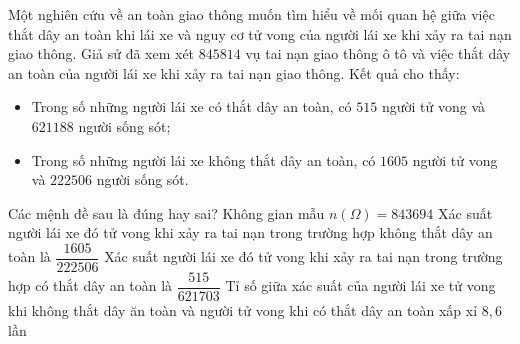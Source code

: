 \begin{ex}%

	Một nghiên cứu về an toàn giao thông muốn tìm hiểu về mối quan hệ giữa việc thắt dây an toàn khi lái xe và nguy cơ tử vong của người lái xe khi xảy ra tai nạn giao thông. Giả sử đã xem xét $845814$ vụ tai nạn giao thông ô tô và việc thắt dây an toàn của người lái xe khi xảy ra tai nạn giao thông. Kết quả cho thấy:
	\begin{itemize}
		\item Trong số những người lái xe có thắt dây an toàn, có $515$ người tử vong và $621188$ người sống sót;
		\item Trong số những người lái xe không thắt dây an toàn, có $1605$ người tử vong và $222506$ người sống sót.
	\end{itemize}
	Các mệnh đề sau là đúng hay sai?
	\choiceTF
	{Không gian mẫu $n(\Omega) = 843694$}
	{Xác suất người lái xe đó tử vong khi xảy ra tai nạn trong trường hợp không thắt dây an toàn là $\dfrac{1605}{222506}$}
	{\True Xác suất người lái xe đó tử vong khi xảy ra tai nạn trong trường hợp có thắt dây an toàn là $\dfrac{515}{621703}$}
	{\True Tỉ số giữa xác suất của người lái xe tử vong khi không thắt dây ăn toàn và người tử vong khi có thắt dây an toàn xấp xỉ $8{,}6$ lần}
\end{ex}

